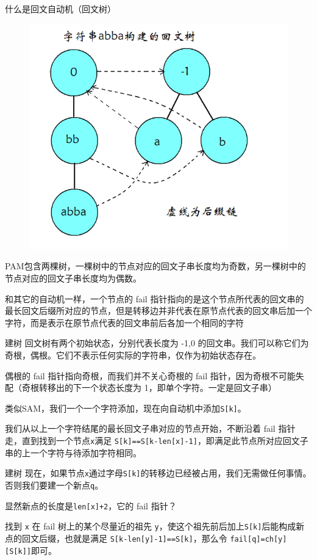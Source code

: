 \documentclass{beamer}
\begin{document}
\begin{frame}{什么是回文自动机（回文树）}
    \small

    \begin{figure}[H]
        \centering
        \includegraphics[width=.4\textwidth]{pic/pam1.png}
    \end{figure}
    \vspace{-1em}

    \pause PAM包含两棵树，一棵树中的节点对应的回文子串长度均为奇数，另一棵树中的节点对应的回文子串长度均为偶数。

    \pause 和其它的自动机一样，一个节点的 fail 指针指向的是这个节点所代表的回文串的最长回文后缀所对应的节点，但是转移边并非代表在原节点代表的回文串后加一个字符，而是表示在原节点代表的回文串前后各加一个相同的字符
\end{frame}

\begin{frame}[fragile]{建树}
    \small
    回文树有两个初始状态，分别代表长度为 -1,0 的回文串。我们可以称它们为奇根，偶根。它们不表示任何实际的字符串，仅作为初始状态存在。
    \vspace{1em}
    
    \pause 偶根的 fail 指针指向奇根，而我们并不关心奇根的 fail 指针，因为奇根不可能失配（奇根转移出的下一个状态长度为 1，即单个字符。一定是回文子串）

    \vspace{1em}
    \pause 类似SAM，我们一个一个字符添加，现在向自动机中添加\verb|S[k]|。

    \pause \vspace{1em}
    我们从以上一个字符结尾的最长回文子串对应的节点开始，不断沿着 fail 指针走，直到找到一个节点\verb|x|满足 \verb|S[k]==S[k-len[x]-1]|，即满足此节点所对应回文子串的上一个字符与待添加字符相同。
\end{frame}

\begin{frame}[fragile]{建树}
    \small
    现在，如果节点\verb|x|通过字母\verb|S[k]|的转移边已经被占用，我们无需做任何事情。否则我们要建一个新点\verb|q|。

    \pause \vspace{1em}
    显然新点的长度是\verb|len[x]+2|，它的 fail 指针？

    \pause \vspace{1em}
    找到 \verb|x| 在 fail 树上的某个尽量近的祖先 \verb|y|，使这个祖先前后加上\verb|S[k]|后能构成新点的回文后缀，也就是满足 \verb|S[k-len[y]-1]==S[k]|，那么令 \verb|fail[q]=ch[y][S[k]]|即可。
\end{frame}
\end{document}

